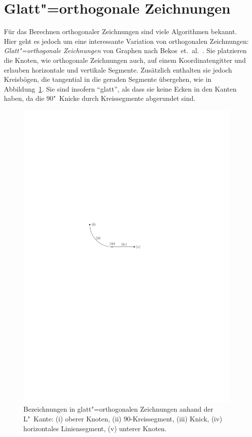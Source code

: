 \documentclass[a4paper]{scrreprt}
\theoremstyle{definition}
\begin{document}

\section{Glatt"=orthogonale Zeichnungen}
\label{sec:smooth_definition}

Für das Berechnen orthogonaler Zeichnungen sind viele Algorithmen bekannt. Hier geht es jedoch um eine interessante Variation von orthogonalen Zeichnungen: \emph{Glatt"=orthogonale Zeichnungen} von Graphen nach Bekos~et.~al.~\cite{bekos-13}. Sie platzieren die Knoten, wie orthogonale Zeichnungen auch, auf einem Koordinatengitter und erlauben horizontale und vertikale Segmente. Zusätzlich enthalten sie jedoch Kreisbögen, die tangential in die geraden Segmente übergehen, wie in Abbildung~\ref{fig:anatomieLKante}. Sie sind insofern "`glatt"', als dass sie keine Ecken in den Kanten haben, da die 90\textdegree"~Knicke durch Kreissegmente abgerundet sind.

\begin{figure}[h]
  \centering
  \includegraphics{anatomieLKante}
  \caption{Bezeichnungen in glatt"=orthogonalen Zeichnungen anhand der L"~Kante: (i) oberer Knoten, (ii) 90\textdegree-Kreissegment, (iii) Knick, (iv) horizontales Liniensegment, (v) unterer Knoten.}
  \label{fig:anatomieLKante}
\end{figure}
\end{document}
